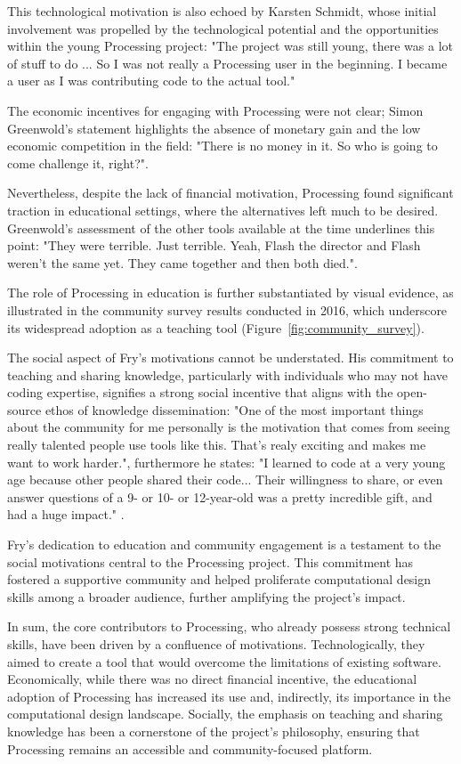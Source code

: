 This technological motivation is also echoed by Karsten Schmidt, whose initial involvement was propelled by the technological potential and the opportunities within the young Processing project: "The project was still young, there was a lot of stuff to do ... So I was not really a Processing user in the beginning. I became a user as I was contributing code to the actual tool." 

The economic incentives for engaging with Processing were not clear; Simon Greenwold's statement highlights the absence of monetary gain and the low economic competition in the field: "There is no money in it. So who is going to come challenge it, right?".

Nevertheless, despite the lack of financial motivation, Processing found significant traction in educational settings, where the alternatives left much to be desired. Greenwold's assessment of the other tools available at the time underlines this point: "They were terrible. Just terrible. Yeah, Flash the director and Flash weren't the same yet. They came together and then both died.".

The role of Processing in education is further substantiated by visual evidence, as illustrated in the community survey results conducted in 2016, which underscore its widespread adoption as a teaching tool (Figure~\ref{fig:community_survey}).

The social aspect of Fry's motivations cannot be understated. His commitment to teaching and sharing knowledge, particularly with individuals who may not have coding expertise, signifies a strong social incentive that aligns with the open-source ethos of knowledge dissemination: "One of the most important things about the community for me personally is the motivation that comes from seeing really talented people use tools like this. That's realy exciting and makes me want to work harder.", furthermore he states: "I learned to code at a very young age because other people shared their code... Their willingness to share, or even answer questions of a 9- or 10- or 12-year-old was a pretty incredible gift, and had a huge impact." .

Fry's dedication to education and community engagement is a testament to the social motivations central to the Processing project. This commitment has fostered a supportive community and helped proliferate computational design skills among a broader audience, further amplifying the project's impact.

In sum, the core contributors to Processing, who already possess strong technical skills, have been driven by a confluence of motivations. Technologically, they aimed to create a tool that would overcome the limitations of existing software. Economically, while there was no direct financial incentive, the educational adoption of Processing has increased its use and, indirectly, its importance in the computational design landscape. Socially, the emphasis on teaching and sharing knowledge has been a cornerstone of the project's philosophy, ensuring that Processing remains an accessible and community-focused platform.

